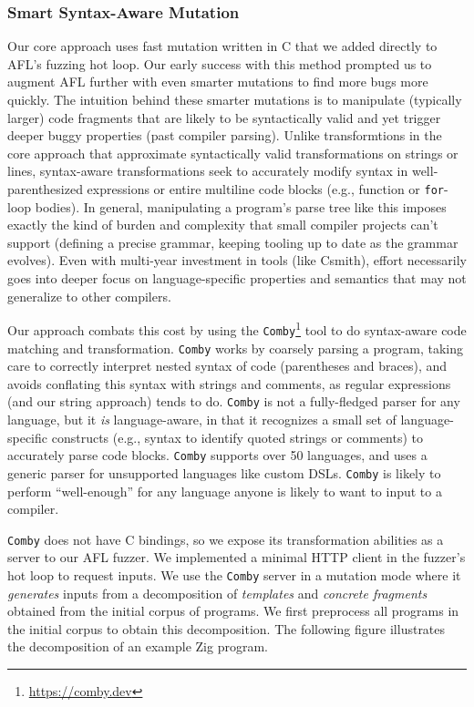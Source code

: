 \subsubsection{Smart Syntax-Aware Mutation}
\label{strat-syntax-aware}

\begin{sloppypar}
Our core approach uses fast mutation written in C that we added directly to
AFL's fuzzing hot loop. Our early success with this method prompted us to
augment AFL further with even smarter mutations to find more bugs more quickly.
The intuition behind these smarter mutations is to manipulate (typically
larger) code fragments that are likely to be syntactically valid and yet
trigger deeper buggy properties (past compiler parsing). Unlike transformtions
in the core approach that approximate syntactically valid transformations on
strings or lines, syntax-aware transformations seek to accurately modify syntax
in well-parenthesized expressions or entire multiline code blocks (e.g.,
function or \texttt{for}-loop bodies). In general, manipulating a program's
parse tree like this imposes exactly the kind of burden and complexity that
small compiler projects can't support (defining a precise grammar, keeping
tooling up to date as the grammar evolves). Even with multi-year investment in
tools (like Csmith), effort necessarily goes into deeper focus on
language-specific properties and semantics %
that may not generalize to other compilers.
\end{sloppypar}

Our approach combats this cost by using the
\texttt{Comby}\footnote{\href{https://comby.dev}{https://comby.dev}} tool to do
syntax-aware code matching and transformation. \texttt{Comby} works by coarsely
parsing a program, taking care to correctly interpret nested syntax of code
(parentheses and braces), and avoids conflating this syntax with strings and
comments, as regular expressions (and our string approach) tends to do.  \texttt{Comby} is not a fully-fledged
parser for any language, but it \emph{is} language-aware, in that it recognizes
a small set of language-specific constructs (e.g., syntax to identify quoted
strings or comments) to accurately parse code blocks. \texttt{Comby} supports
over 50 languages, and uses a generic parser for unsupported languages like custom
DSLs. \texttt{Comby} is likely to perform ``well-enough'' for any language
anyone is likely to want to input to a compiler.

\texttt{Comby} does not have C bindings, so we expose its transformation
abilities as a server to our AFL fuzzer. We implemented a minimal HTTP client
in the fuzzer's hot loop to request inputs. We use the \texttt{Comby} server in
a mutation mode where it \emph{generates} inputs from a decomposition of
\emph{templates} and \emph{concrete fragments} obtained from the initial corpus
of programs. We first preprocess all programs in the initial corpus to obtain
this decomposition. The following figure illustrates the decomposition of an
example Zig program.

